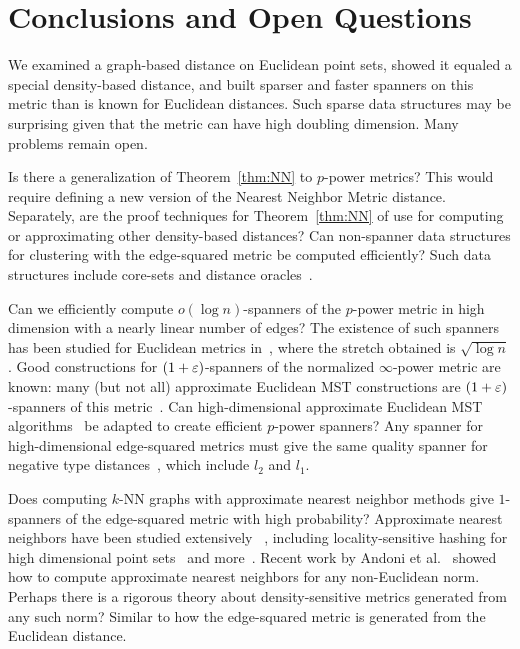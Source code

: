 \section{Conclusions and Open Questions}\label{sec:conclusions}


We examined a
graph-based distance on Euclidean point sets, showed it equaled a
special density-based distance, and built sparser and faster
spanners
on this metric than is known for Euclidean distances.
Such sparse data structures may be
surprising given that the metric can have high doubling dimension.
Many problems remain open.

Is there a generalization of Theorem~\ref{thm:NN} to $p$-power
metrics? This would
require defining a new version of the Nearest Neighbor Metric distance. Separately, are the
proof techniques for Theorem~\ref{thm:NN} of use for computing
or approximating other density-based distances?
Can non-spanner data
structures for clustering with the edge-squared metric be
computed efficiently?
Such data structures include core-sets and
distance oracles~\cite{Badoiu02, Sohler18, Thorup05}.

Can we efficiently compute $o(\log n)$-spanners of the $p$-power metric in
high dimension with a
nearly linear number of edges?
The existence of such spanners has been studied for Euclidean metrics in~\cite{HarPeled13}, where the stretch
obtained is $\sqrt{\log n}$.
Good constructions for $(1+\varepsilon)$-spanners of the
normalized $\infty$-power metric are known: many (but not all) approximate Euclidean MST constructions are
$(1+\varepsilon)$-spanners of this metric~\cite{Callahan1995, Yaro2017}.
Can high-dimensional
approximate Euclidean MST algorithms~\cite{Alman2016, Yaro2017, Andoni2014}
be adapted to
create efficient $p$-power spanners?
Any spanner for high-dimensional
edge-squared metrics must
give the same quality spanner for negative type
distances~\cite{Schoenberg1937, Deza1997},
which include $l_2$ and $l_1$.

Does computing $k$-NN graphs with approximate nearest neighbor methods give $1$-spanners of the
edge-squared metric with high probability?
Approximate nearest neighbors have been studied extensively
~\cite{kNNsurvey, Chen11, Dong11}, including locality-sensitive
hashing for high dimensional point sets~\cite{LSH} and
more~\cite{Laarhoven2018}.
Recent work by Andoni et al.~\cite{Andoni2018} showed how to compute
approximate nearest neighbors for any non-Euclidean norm.  Perhaps there
is a rigorous theory about density-sensitive metrics generated from any such
norm? Similar to
how the edge-squared metric is generated from the Euclidean distance.

